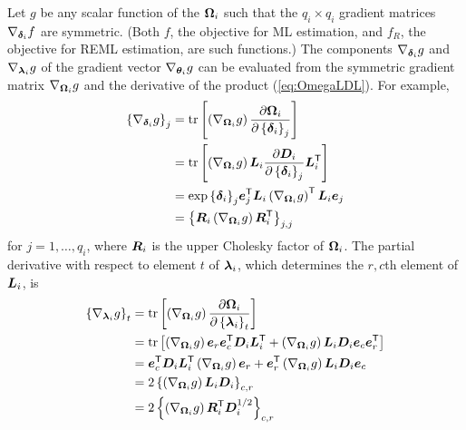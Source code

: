 \documentclass[12pt]{article}
\begin{document}
Let $g$ be any scalar function of the $\bm{\Omega}_i$ such that the
$q_i\times q_i$ gradient matrices $\nabla_{\bm{\delta}_i}f$ are symmetric.
(Both $f$, the objective for ML estimation, and $f_R$, the objective
for REML estimation, are such functions.)  The components
$\nabla_{\bm{\delta}_i}g$ and $\nabla_{\bm{\lambda}_i}g$ of the gradient
vector $\nabla_{\bm{\theta}_i}g$ can be evaluated from the symmetric
gradient matrix $\nabla_{\bm{\Omega}_i}g$ and the
derivative of the product (\ref{eq:OmegaLDL}).  For example,
\begin{equation}
  \label{eq:deltaPartial}
  \begin{aligned}
    \left\{\nabla_{\bm{\delta}_i}g\right\}_j
    &=\operatorname{tr}\left[\left(\nabla_{\bm{\Omega}_i}g\right)
      \frac{\partial \bm{\Omega}_i}{\partial \left\{\bm{\delta}_i\right\}_j}\right]\\
    &=\operatorname{tr}\left[\left(\nabla_{\bm{\Omega}_i}g\right)\bm{L}_i\frac{\partial{\ensuremath{\bm{D}}_i}}
      {\partial\left\{\bm{\delta}_i\right\}_j}\bm{L}_i^\mathsf{T}\right]\\
    &=\exp{\left\{\ensuremath{\bm{\delta}}_i\right\}_j}\bm{e}_j^\mathsf{T}
    \bm{L}_i\left(\nabla_{\bm{\Omega}_i}g\right)^\mathsf{T}\bm{L}_i\bm{e}_j\\
    &=\left\{\bm{R}_i\left(\nabla_{\bm{\Omega}_i}g\right)\bm{R}_i^\mathsf{T}\right\}_{j,j}
  \end{aligned}
\end{equation}
for $j=1,\dots,q_i$, where $\bm{R}_i$ is the upper Cholesky factor of $\bm{\Omega}_i$.
The partial derivative with respect to
element $t$ of $\bm{\lambda}_i$, which determines the $r,c$th element of
$\bm{L}_i$, is
\begin{equation}
  \label{eq:lambdaPartial}
  \begin{aligned}
    \left\{\nabla_{\bm{\lambda}_i}g\right\}_t
    &=\operatorname{tr}\left[\left(\nabla_{\bm{\Omega}_i}g\right)
      \frac{\partial\bm{\Omega}_i}{\partial\left\{\bm{\lambda}_i\right\}_t}\right]\\
    &=\operatorname{tr}\left[\left(\nabla_{\bm{\Omega}_i}g\right)
      \bm{e}_r\bm{e}_c^\mathsf{T}\bm{D}_i\bm{L}_i^\mathsf{T}
      +\left(\nabla_{\bm{\Omega}_i}g\right) 
      \bm{L}_i\bm{D}_i\bm{e}_c\bm{e}_r^\mathsf{T}\right]\\
    &=\bm{e}_c^\mathsf{T}\bm{D}_i\bm{L}_i^\mathsf{T}\left(\nabla_{\bm{\Omega}_i}g\right)\bm{e}_r
    +\bm{e}_r^\mathsf{T}\left(\nabla_{\bm{\Omega}_i}g\right)\bm{L}_i\bm{D}_i\bm{e}_c\\
    &=2\left\{\left(\nabla_{\bm{\Omega}_i}g\right)\bm{L}_i\bm{D}_i\right\}_{c,r}\\
    &=2\left\{\left(\nabla_{\bm{\Omega}_i}g\right)\bm{R}_i^\mathsf{T}\bm{D}_i^{1/2}\right\}_{c,r}
  \end{aligned}
\end{equation}
\end{document}
